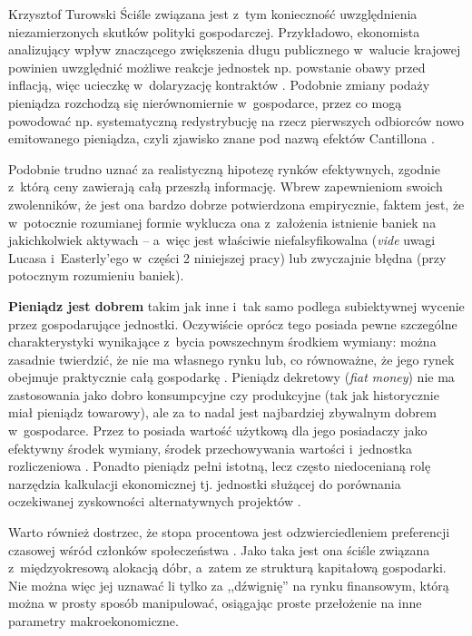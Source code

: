 \begin{artplenv}{Krzysztof Turowski}
Ściśle związana jest z~tym konieczność uwzględnienia niezamierzonych skutków polityki gospodarczej. Przykładowo,
ekonomista analizujący wpływ znaczącego zwiększenia długu publicznego w~walucie krajowej powinien uwzględnić możliwe
reakcje jednostek np. powstanie obawy przed inflacją, więc ucieczkę w~dolaryzację kontraktów
\parencite{palley_money_2015}.
Podobnie zmiany podaży pieniądza rozchodzą się nierównomiernie w~gospodarce,
przez co mogą powodować np. systematyczną redystrybucję na rzecz pierwszych odbiorców nowo emitowanego
pieniądza, czyli zjawisko znane pod nazwą efektów Cantillona
\parencite{sieron_efekt_2017}.

Podobnie trudno uznać za realistyczną hipotezę rynków efektywnych, zgodnie z~którą ceny zawierają całą przeszłą
informację. Wbrew zapewnieniom swoich zwolenników, że jest ona bardzo dobrze potwierdzona empirycznie, faktem jest, że
w~potocznie rozumianej formie wyklucza ona z~założenia istnienie baniek na jakichkolwiek aktywach  --  a~więc
jest właściwie niefalsyfikowalna (\textit{vide} uwagi Lucasa i~Easterly’ego w~części 2 niniejszej pracy) lub zwyczajnie
błędna (przy potocznym rozumieniu baniek).

\textbf{Pieniądz jest dobrem} takim jak inne i~tak samo podlega subiektywnej wycenie przez gospodarujące jednostki.
Oczywiście oprócz tego posiada pewne szczególne charakterystyki wynikające z~bycia powszechnym środkiem wymiany: można
zasadnie twierdzić, że nie ma własnego rynku lub, co równoważne, że jego rynek obejmuje praktycznie całą gospodarkę
\parencite{horwitz_microfoundations_2000}.
Pieniądz dekretowy (\textit{fiat money}) nie ma zastosowania jako dobro
konsumpcyjne czy produkcyjne (tak jak historycznie miał pieniądz towarowy), ale za to nadal jest najbardziej zbywalnym
dobrem w~gospodarce. Przez to posiada wartość użytkową dla jego posiadaczy jako efektywny środek wymiany, środek
przechowywania wartości i~jednostka rozliczeniowa
\parencite{jevons_money_1876}.
Ponadto pieniądz pełni
istotną, lecz często niedocenianą rolę narzędzia kalkulacji ekonomicznej tj. jednostki służącej do porównania
oczekiwanej zyskowności alternatywnych projektów
\parencite{mises_kalkulacja_2011}.

Warto również dostrzec, że stopa procentowa jest odzwierciedleniem preferencji czasowej wśród członków społeczeństwa
\parencite{rothbard_man_1962}.
Jako taka jest ona ściśle związana z~międzyokresową alokacją dóbr, a~zatem
ze strukturą kapitałową gospodarki. Nie można więc jej uznawać li tylko za ,,dźwignię'' na rynku finansowym, którą można
w prosty sposób manipulować, osiągając proste przełożenie na inne parametry makroekonomiczne.


\end{artplenv}
